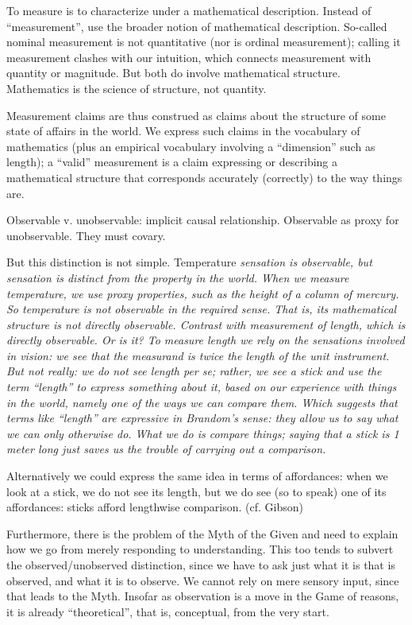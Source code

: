\documentclass[11pt,twoside]{article}
\begin{document}
To measure is to characterize under a mathematical description.
Instead of ``measurement'', use the broader notion of mathematical
description.  So-called nominal measurement is not quantitative (nor
is ordinal measurement); calling it measurement clashes with our
intuition, which connects measurement with quantity or magnitude.  But
both do involve mathematical structure.  Mathematics is the science of
structure, not quantity.

Measurement claims are thus construed as claims about the structure of
some state of affairs in the world.  We express such claims in the
vocabulary of mathematics (plus an empirical vocabulary involving a
``dimension'' such as length); a ``valid'' measurement is a claim
expressing or describing a mathematical structure that corresponds
accurately (correctly) to the way things are.

Observable v. unobservable: implicit causal relationship.  Observable
as proxy for unobservable.  They must covary.

But this distinction is not simple.  Temperature \it{sensation} is
observable, but sensation is distinct from the property in the world.
When we measure temperature, we use proxy properties, such as the
height of a column of mercury.  So temperature is not observable in
the required sense.  That is, its mathematical structure is not
directly observable.  Contrast with measurement of length, which is
directly observable.  Or is it?  To measure length we rely on the
sensations involved in vision: we see that the measurand is twice the
length of the unit instrument.  But not really: we do not \it{see}
length per se; rather, we see a stick and use the term ``length'' to
express something about it, based on our experience with things in the
world, namely one of the ways we can compare them.  Which suggests
that terms like ``length'' are expressive in Brandom's sense: they
allow us to say what we can only otherwise do.  What we do is compare
things; saying that a stick is 1 meter long just saves us the trouble
of carrying out a comparison.

Alternatively we could express the same idea in terms of affordances:
when we look at a stick, we do not see its length, but we do see (so
to speak) one of its affordances: sticks afford lengthwise
comparison. (cf. Gibson)

Furthermore, there is the problem of the Myth of the Given and need to
explain how we go from merely responding to understanding.  This too
tends to subvert the observed/unobserved distinction, since we have to
ask just what it is that is observed, and what it is to observe.  We
cannot rely on mere sensory input, since that leads to the Myth.
Insofar as observation is a move in the Game of reasons, it is already
``theoretical'', that is, conceptual, from the very start.
\end{document}
